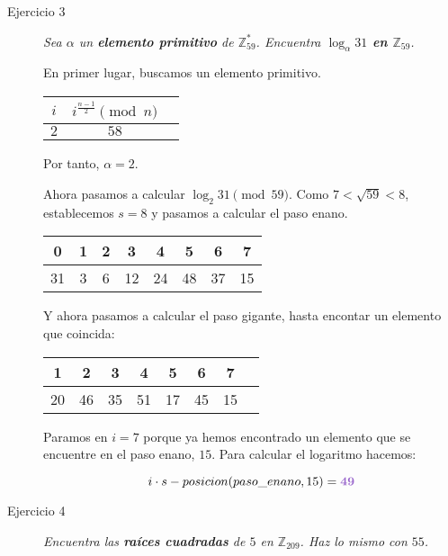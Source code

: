 \documentclass[10pt,spanish]{article}
\begin{document}
\begin{description}
    \item[Ejercicio 3] \textit{Sea $\alpha$ un \textbf{\textcolor{morado}{elemento primitivo}} de $\mathbb{Z}_{59}^*$. Encuentra \textbf{\textcolor{morado}{$\log_{\alpha} 31$ en $\mathbb{Z}_{59}$}}.}

    En primer lugar, buscamos un elemento primitivo.

    \begin{center}
    \begin{tabular}{c | c | c}
    $i$ & $i^{\frac{n-1}{2}} \pmod n$ \\
    \hline
    $2$ & $58$  
    \end{tabular}
    \end{center}

    Por tanto, $\alpha = 2$.

    Ahora pasamos a calcular $\log_2 31 \pmod{59}$. Como $7 < \sqrt{59} < 8$, establecemos $s = 8$ y pasamos a calcular el paso enano.

    \begin{center}
    \begin{tabular}{c | c | c | c | c | c | c | c}
    0 & 1 & 2 & 3 & 4 & 5 & 6 & 7 \\
    \hline 
    31 & 3 & 6 & 12 & 24 & 48 & 37 & 15
    \end{tabular}
    \end{center}

    Y ahora pasamos a calcular el paso gigante, hasta encontar un elemento que coincida:

    \begin{center}
    \begin{tabular}{c | c | c | c | c | c | c | c}
    1 & 2 & 3 & 4 & 5 & 6 & 7 \\
    \hline 
    20 & 46 & 35 & 51 & 17 & 45 & 15 
    \end{tabular}
    \end{center}

    Paramos en $i=7$ porque ya hemos encontrado un elemento que se encuentre en el paso enano, $15$. Para calcular el logaritmo hacemos:

    \begin{displaymath}
        i \cdot s - posicion(paso\_enano, 15) = \mathbf{\textcolor{morado}{49}}
    \end{displaymath}

    \item[Ejercicio 4] \textit{Encuentra las \textcolor{morado}{\textbf{raíces cuadradas}} de $5$ en $\mathbb{Z}_{209}$. Haz lo mismo con $55$.}


\end{description}
\end{document}
